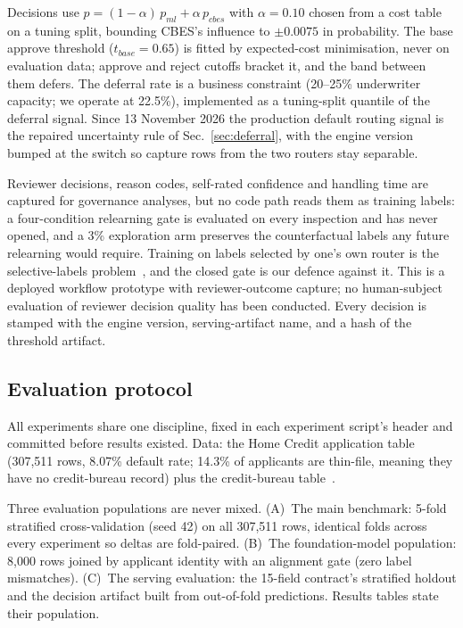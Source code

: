 \documentclass[conference]{IEEEtran}
\begin{document}
Decisions use $p = (1-\alpha)\,p_{ml} + \alpha\,p_{cbes}$ with
$\alpha = 0.10$ chosen from a cost table on a tuning split, bounding CBES's
influence to $\pm 0.0075$ in probability. The base approve threshold
($t_{base}=0.65$) is fitted by expected-cost minimisation, never on
evaluation data; approve and reject cutoffs bracket it, and the band between
them defers. The deferral rate is a business constraint (20--25\%
underwriter capacity; we operate at 22.5\%), implemented as a tuning-split
quantile of the deferral signal. Since 13 November 2026 the production
default routing signal is the repaired uncertainty rule of
Sec.~\ref{sec:deferral}, with the engine version bumped at the switch so
capture rows from the two routers stay separable.

Reviewer decisions, reason codes, self-rated confidence and handling time
are captured for governance analyses, but no code path reads them as
training labels: a four-condition relearning gate is evaluated on every
inspection and has never opened, and a 3\% exploration arm preserves the
counterfactual labels any future relearning would require. Training on
labels selected by one's own router is the selective-labels
problem~\cite{lakkaraju2017}, and the closed gate is our defence against
it. This is a deployed workflow prototype with reviewer-outcome capture; no
human-subject evaluation of reviewer decision quality has been conducted.
Every decision is stamped with the engine version, serving-artifact name,
and a hash of the threshold artifact.

\subsection{Evaluation protocol}
All experiments share one discipline, fixed in each experiment script's
header and committed before results existed. Data: the Home Credit
application table (307{,}511 rows, 8.07\% default rate; 14.3\% of
applicants are thin-file, meaning they have no credit-bureau record) plus
the credit-bureau table~\cite{homecredit}.

Three evaluation populations are never mixed. (A)~The main benchmark:
5-fold stratified cross-validation (seed 42) on all 307{,}511 rows,
identical folds across every experiment so deltas are fold-paired. (B)~The
foundation-model population: 8{,}000 rows joined by applicant identity with
an alignment gate (zero label mismatches). (C)~The serving evaluation: the
15-field contract's stratified holdout and the decision artifact built from
out-of-fold predictions. Results tables state their population.
\end{document}
